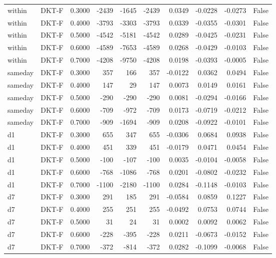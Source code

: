 \begin{tabular}{llrrrrrrrr}
within & DKT-F & 0.3000 & -2439 & -1645 & -2439 & 0.0349 & -0.0228 & -0.0273 & False \\
within & DKT-F & 0.4000 & -3793 & -3303 & -3793 & 0.0339 & -0.0355 & -0.0301 & False \\
within & DKT-F & 0.5000 & -4542 & -5181 & -4542 & 0.0289 & -0.0425 & -0.0231 & False \\
within & DKT-F & 0.6000 & -4589 & -7653 & -4589 & 0.0268 & -0.0429 & -0.0103 & False \\
within & DKT-F & 0.7000 & -4208 & -9750 & -4208 & 0.0198 & -0.0393 & -0.0005 & False \\
sameday & DKT-F & 0.3000 & 357 & 166 & 357 & -0.0122 & 0.0362 & 0.0494 & False \\
sameday & DKT-F & 0.4000 & 147 & 29 & 147 & 0.0073 & 0.0149 & 0.0161 & False \\
sameday & DKT-F & 0.5000 & -290 & -290 & -290 & 0.0081 & -0.0294 & -0.0166 & False \\
sameday & DKT-F & 0.6000 & -709 & -972 & -709 & 0.0173 & -0.0719 & -0.0212 & False \\
sameday & DKT-F & 0.7000 & -909 & -1694 & -909 & 0.0208 & -0.0922 & -0.0101 & False \\
d1 & DKT-F & 0.3000 & 655 & 347 & 655 & -0.0306 & 0.0684 & 0.0938 & False \\
d1 & DKT-F & 0.4000 & 451 & 339 & 451 & -0.0179 & 0.0471 & 0.0454 & False \\
d1 & DKT-F & 0.5000 & -100 & -107 & -100 & 0.0035 & -0.0104 & -0.0058 & False \\
d1 & DKT-F & 0.6000 & -768 & -1086 & -768 & 0.0201 & -0.0802 & -0.0232 & False \\
d1 & DKT-F & 0.7000 & -1100 & -2180 & -1100 & 0.0284 & -0.1148 & -0.0103 & False \\
d7 & DKT-F & 0.3000 & 291 & 185 & 291 & -0.0584 & 0.0859 & 0.1227 & False \\
d7 & DKT-F & 0.4000 & 255 & 251 & 255 & -0.0492 & 0.0753 & 0.0744 & False \\
d7 & DKT-F & 0.5000 & 31 & 24 & 31 & 0.0002 & 0.0092 & 0.0062 & False \\
d7 & DKT-F & 0.6000 & -228 & -395 & -228 & 0.0211 & -0.0673 & -0.0152 & False \\
d7 & DKT-F & 0.7000 & -372 & -814 & -372 & 0.0282 & -0.1099 & -0.0068 & False \\
\bottomrule
\end{tabular}
